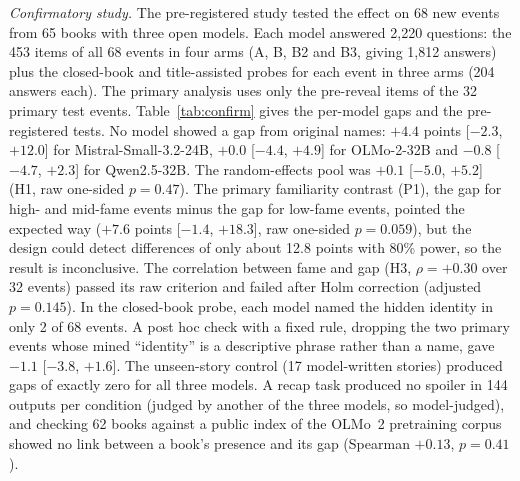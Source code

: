 \documentclass[sn-mathphys]{sn-jnl}%
\theoremstyle{thmstyleone}%
\theoremstyle{thmstyletwo}%
\theoremstyle{thmstylethree}%
\begin{document}
\emph{Confirmatory study.} The pre-registered study tested the effect on 68 new events from 65 books with three open models. Each model answered 2,220 questions: the 453 items of all 68 events in four arms (A, B, B2 and B3, giving 1,812 answers) plus the closed-book and title-assisted probes for each event in three arms (204 answers each). The primary analysis uses only the pre-reveal items of the 32 primary test events. Table~\ref{tab:confirm} gives the per-model gaps and the pre-registered tests. No model showed a gap from original names: $+4.4$ points [$-2.3$, $+12.0$] for Mistral-Small-3.2-24B, $+0.0$ [$-4.4$, $+4.9$] for OLMo-2-32B and $-0.8$ [$-4.7$, $+2.3$] for Qwen2.5-32B. The random-effects pool was $+0.1$ [$-5.0$, $+5.2$] (H1, raw one-sided $p=0.47$). The primary familiarity contrast (P1), the gap for high- and mid-fame events minus the gap for low-fame events, pointed the expected way ($+7.6$ points [$-1.4$, $+18.3$], raw one-sided $p=0.059$), but the design could detect differences of only about 12.8 points with 80\% power, so the result is inconclusive. The correlation between fame and gap (H3, $\rho=+0.30$ over 32 events) passed its raw criterion and failed after Holm correction (adjusted $p=0.145$). In the closed-book probe, each model named the hidden identity in only 2 of 68 events. A post hoc check with a fixed rule, dropping the two primary events whose mined ``identity'' is a descriptive phrase rather than a name, gave $-1.1$ [$-3.8$, $+1.6$]. The unseen-story control (17 model-written stories) produced gaps of exactly zero for all three models. A recap task produced no spoiler in 144 outputs per condition (judged by another of the three models, so model-judged), and checking 62 books against a public index of the OLMo~2 pretraining corpus showed no link between a book's presence and its gap (Spearman $+0.13$, $p=0.41$).
\end{document}
